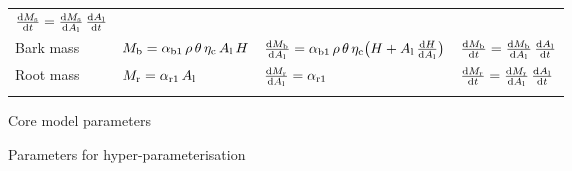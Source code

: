 \documentclass[10pt,twoside]{article}
\begin{document}
\begin{table}[h!]
\begin{tabular}{p{2.5cm}p{3.5cm}p{5cm}p{4cm} }
$\frac{{\rm d}M_{\rm s}}{{\rm d}t} = \frac{{\rm d}M_{\rm s}}{{\rm d}A_{\rm l}} \, \frac{{\rm d}A_{\rm l}}{{\rm d}t}$ \\
Bark mass &
$M_{\rm b} = \alpha_{{\rm b1}} \, \rho \, \theta \, \eta_{\rm c} \, A_{\rm l} \, H $ &
$\frac{{\rm d}M_{\rm b}}{{\rm d}A_{\rm l}} = \alpha_{{\rm b1}} \, \rho \, \theta \, \eta_{\rm c}\big(H + A_{\rm l} \, \frac{{\rm d}H}{{\rm d}A_{\rm l}} \big)$ &
$\frac{{\rm d}M_{\rm b}}{{\rm d}t} = \frac{{\rm d}M_{\rm b}}{{\rm d}A_{\rm l}} \, \frac{{\rm d}A_{\rm l}}{{\rm d}t}$ \\
Root mass &
$M_{\rm r} = \alpha_{{\rm r1}} \, A_{\rm l}$ &
$\frac{{\rm d}M_{\rm r}}{{\rm d}A_{\rm l}} = \alpha_{{\rm r1}}$ &
$\frac{{\rm d}M_{\rm r}}{{\rm d}t} = \frac{{\rm d}M_{\rm r}}{{\rm d}A_{\rm l}} \, \frac{{\rm d}A_{\rm l}}{{\rm d}t}$ \\
\hline \\
\end{tabular}
\label{tab:allometry}
\end{table}

\newpage

\begin{table}[h!]
\caption{Core model parameters}

\label{tab:params_core}
\end{table}

\begin{table}[h!]
\caption{Parameters for hyper-parameterisation}

\label{tab:params_hyper}
\end{table}

\clearpage


\end{document}
